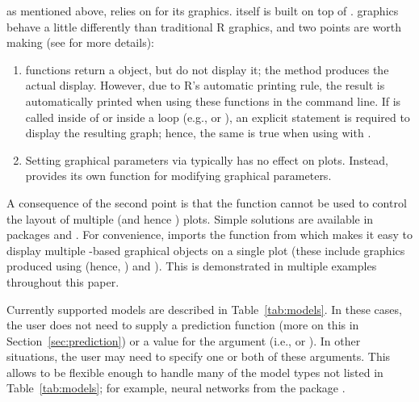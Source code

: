  as mentioned above,  relies on  for its graphics.  itself is built on top of  \citep{grid-pkg}.  graphics behave a little differently than traditional R graphics, and two points are worth making (see  for more details):
\begin{enumerate}
  \item {} functions return a  object, but do not display it; the  method produces the actual display. However, due to R's automatic printing rule, the result is automatically printed when using these functions in the command line. If  is called inside of  or inside a loop (e.g.,  or ), an explicit  statement is required to display the resulting graph; hence, the same is true when using  with .
  \item Setting graphical parameters via  typically has no effect on  plots. Instead,  provides its own  function for modifying graphical parameters.
\end{enumerate}
A consequence of the second point is that the  function cannot be used to control the layout of multiple  (and hence ) plots. Simple solutions are available in packages  \citep{latticeExtra-pkg} and  \citep{gridExtra-pkg}. For convenience,  imports the  function from  which makes it easy to display multiple -based graphical objects on a single plot (these include graphics produced using  (hence, ) and ). This is demonstrated in multiple examples throughout this paper.

Currently supported models are described in Table~\ref{tab:models}. In these cases, the user does not need to supply a prediction function (more on this in Section~\ref{sec:prediction}) or a value for the  argument (i.e.,  or ). In other situations, the user may need to specify one or both of these arguments. This allows  to be flexible enough to handle many of the model types not listed in Table~\ref{tab:models}; for example, neural networks from the  package \citep{venables-modern-2002}.%

